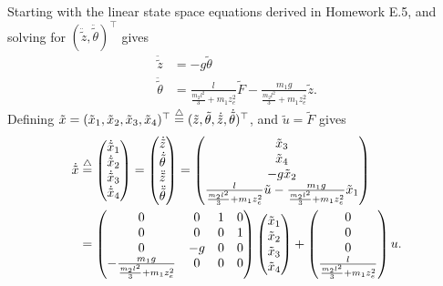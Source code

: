 Starting with the linear state space equations derived in Homework E.5, and solving for $(\ddot{\tilde{z}}, \ddot{\tilde{\theta}})^\top$ gives
\begin{align*}
  \ddot{\tilde{z}} &= - g \tilde{\theta} \\
  \ddot{\tilde{\theta}} &= \frac{l}{\frac{m_2 l^2}{3} + m_1 z_e^2} \tilde{F} - \frac{m_1 g}{\frac{m_2 l^2}{3} + m_1 z_e^2} \tilde{z}.
\end{align*}
Defining $\tilde{x} = (\tilde{x}_1, \tilde{x}_2, \tilde{x}_3, \tilde{x}_4)^\top \stackrel{\triangle}{=} (\tilde{z}, \tilde{\theta}, \dot{\tilde{z}}, \dot{\tilde{\theta}})^\top$, and $\tilde{u} = \tilde{F}$ gives
\begin{align*}
	\dot{\tilde{x}} &\stackrel{\triangle}{=} \begin{pmatrix} 
		\dot{\tilde{x}}_1 \\
		\dot{\tilde{x}}_2 \\
		\dot{\tilde{x}}_3 \\
		\dot{\tilde{x}}_4 \end{pmatrix}
	= \begin{pmatrix} \dot{\tilde{z}} \\ \dot{\tilde{\theta}} \\ \ddot{\tilde{z}} \\ \ddot{\tilde{\theta}} \end{pmatrix}
	= \begin{pmatrix} \tilde{x}_3 \\ \tilde{x}_4 \\  - g \tilde{x}_2 \\   \frac{l}{\frac{m_2 l^2}{3} + m_1 z_e^2} \tilde{u} - \frac{m_1 g}{\frac{m_2 l^2}{3} + m_1 z_e^2} \tilde{x}_1  \end{pmatrix} \\
	&= \begin{pmatrix}
     0 & 0  & 1 & 0 \\
     0 & 0  & 0 & 1 \\
     0 & -g & 0 & 0\\
    - \frac{m_1 g}{\frac{m_2 l^2}{3} + m_1 z_e^2} & 0 & 0 & 0 \end{pmatrix}
  \begin{pmatrix}
    \tilde{x}_1 \\
    \tilde{x}_2 \\
    \tilde{x}_3 \\
    \tilde{x}_4
  \end{pmatrix}
  +
  \begin{pmatrix}
    0 \\
    0 \\
    0 \\
    \frac{l}{\frac{m_2 l^2}{3} + m_1 z_e^2} 
  \end{pmatrix} u.
\end{align*}
